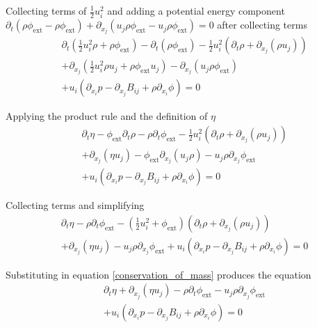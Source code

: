 \documentclass[%
 reprint,
 amsmath,amssymb,
 aps,
]{revtex4-1}
\begin{document}
Collecting terms of $\frac{1}{2}u_i^2$ and adding a potential energy component $\partial_t\left(\rho\phi_{\text{ext}} - \rho\phi_{\text{ext}}\right) + \partial_{x_j}\left(u_j\rho\phi_{\text{ext}} - u_j\rho\phi_{\text{ext}}\right)=0$ after collecting terms
\[
\begin{split}
& \partial_t\left(\frac{1}{2}u_i^2\rho + \rho\phi_{\text{ext}}\right) - \partial_t\left(\rho\phi_{\text{ext}}\right) - \frac{1}{2}u_i^2\left(\partial_t\rho + \partial_{x_j}\left(\rho u_j\right)\right) \\ & + \partial_{x_j}\left(\frac{1}{2}u_i^2\rho u_j + \rho\phi_{\text{ext}}u_j\right) - \partial_{x_j}\left(u_j\rho\phi_{\text{ext}}\right) \\ & + u_i\left(\partial_{x_i}p - \partial_{x_j}B_{ij} + \rho\partial_{x_i}\phi\right)=0
\end{split}
\]

Applying the product rule and the definition of $\eta$
\[
\begin{split}
& \partial_t\eta - \phi_{\text{ext}}\partial_t\rho - \rho\partial_t\phi_{\text{ext}} - \frac{1}{2}u_i^2\left(\partial_t\rho + \partial_{x_j}\left(\rho u_j\right)\right) \\ & + \partial_{x_j}\left(\eta u_j\right) - \phi_{\text{ext}}\partial_{x_j}\left(u_j\rho\right) - u_j\rho\partial_{x_j}\phi_{\text{ext}} \\ & + u_i\left(\partial_{x_i}p - \partial_{x_j}B_{ij} + \rho\partial_{x_i}\phi\right)=0
\end{split}
\]

Collecting terms and simplifying
\[
\begin{split}
& \partial_t\eta - \rho\partial_t\phi_{\text{ext}} - \left(\frac{1}{2}u_i^2 + \phi_{\text{ext}}\right)\left(\partial_t\rho + \partial_{x_j}\left(\rho u_j\right)\right) \\ & + \partial_{x_j}\left(\eta u_j\right) - u_j\rho\partial_{x_j}\phi_{\text{ext}} + u_i\left(\partial_{x_i}p - \partial_{x_j}B_{ij} + \rho\partial_{x_i}\phi\right)=0
\end{split}
\]

Substituting in equation \eqref{conservation_of_mass} produces the equation
\[
\begin{split}
& \partial_t\eta + \partial_{x_j}\left(\eta u_j\right) - \rho\partial_t\phi_{\text{ext}} - u_j\rho\partial_{x_j}\phi_{\text{ext}} \\ & + u_i\left(\partial_{x_i}p - \partial_{x_j}B_{ij} + \rho\partial_{x_i}\phi\right)=0
\end{split}
\]
\end{document}
